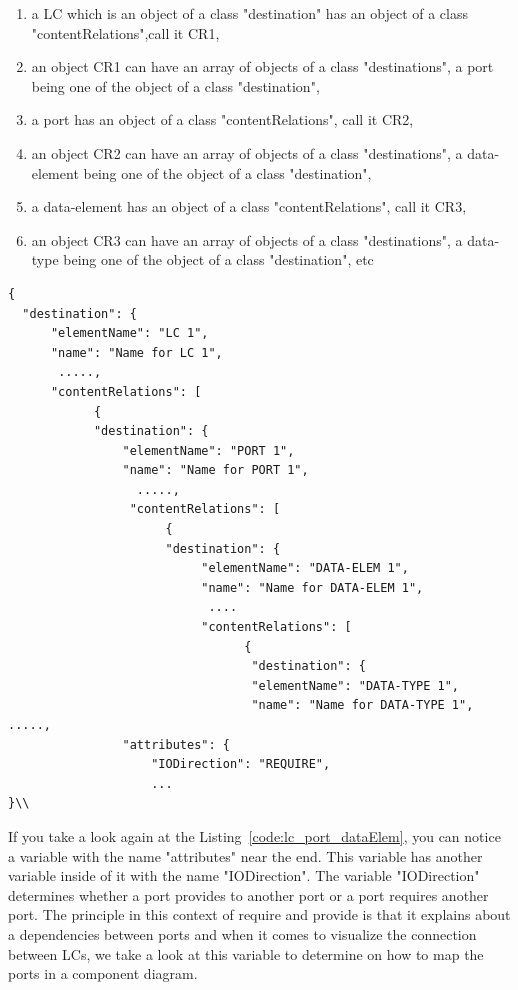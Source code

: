 \begin{enumerate}
\item a LC which is an object of a class "destination" has an object of a class "contentRelations",call it CR1,
\item an object CR1 can have an array of objects of a class "destinations", a port being one of the object of a class  "destination",
\item a port has an object of a class "contentRelations", call it CR2,
\item an object CR2 can have an array of objects of a class "destinations", a data-element being one of the object of a class "destination",
\item a data-element has an object of a class "contentRelations", call it CR3,
\item an object CR3 can have an array of objects of a class "destinations", a data-type being one of the object of a class "destination", etc \\
\end{enumerate} 


\begin{lstlisting}[caption={A sample part of a JSON file showing the relationship between a LC, a port and a data-element},label=code:lc_port_dataElem]
{
  "destination": {
      "elementName": "LC 1", 
      "name": "Name for LC 1", 
       ....., 
      "contentRelations": [
            {
            "destination": {
                "elementName": "PORT 1", 
                "name": "Name for PORT 1", 
                  ....., 
                 "contentRelations": [
                      {
                      "destination": {
                           "elementName": "DATA-ELEM 1", 
                           "name": "Name for DATA-ELEM 1", 
                            .... 
                           "contentRelations": [
                                 {
                                  "destination": {
                                  "elementName": "DATA-TYPE 1", 
                                  "name": "Name for DATA-TYPE 1",    .....,   
                "attributes": {
                    "IODirection": "REQUIRE",
                    ...
}\\
\end{lstlisting}

If you take a look again at the Listing~\ref{code:lc_port_dataElem}, you can notice a variable with the name "attributes" near the end. This variable has another variable inside of it with the name "IODirection". The variable "IODirection" determines whether a port provides to another port or a port requires another port. The principle in this context of require and provide is that it explains about a dependencies between ports and when it comes to visualize the connection between LCs, we take a look at this variable to determine on how to map the ports in a component diagram. 


